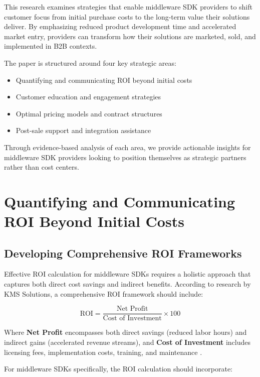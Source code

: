 \documentclass[11pt,a4paper]{article}
\begin{document}
This research examines strategies that enable middleware SDK providers to shift customer focus from initial purchase costs to the long-term value their solutions deliver. By emphasizing reduced product development time and accelerated market entry, providers can transform how their solutions are marketed, sold, and implemented in B2B contexts.

The paper is structured around four key strategic areas:
\begin{itemize}
    \item Quantifying and communicating ROI beyond initial costs
    \item Customer education and engagement strategies
    \item Optimal pricing models and contract structures
    \item Post-sale support and integration assistance
\end{itemize}

Through evidence-based analysis of each area, we provide actionable insights for middleware SDK providers looking to position themselves as strategic partners rather than cost centers.

\section{Quantifying and Communicating ROI Beyond Initial Costs}

\subsection{Developing Comprehensive ROI Frameworks}

Effective ROI calculation for middleware SDKs requires a holistic approach that captures both direct cost savings and indirect benefits. According to research by KMS Solutions, a comprehensive ROI framework should include:

\begin{equation}
\text{ROI} = \frac{\text{Net Profit}}{\text{Cost of Investment}} \times 100
\end{equation}

Where \textbf{Net Profit} encompasses both direct savings (reduced labor hours) and indirect gains (accelerated revenue streams), and \textbf{Cost of Investment} includes licensing fees, implementation costs, training, and maintenance \cite{kms2023}.

For middleware SDKs specifically, the ROI calculation should incorporate:
\end{document}
